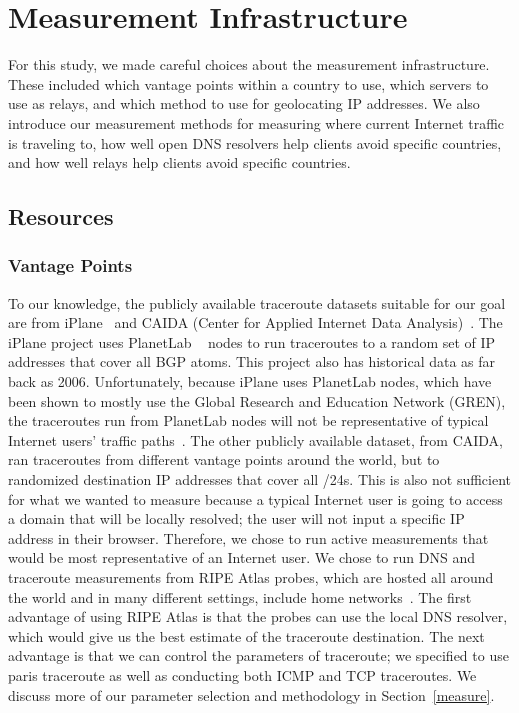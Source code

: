 \section{Measurement Infrastructure}
\label{datasets}
For this study, we made careful choices about the measurement infrastructure.  These included which vantage points within a country to use, which servers to use as relays, and which method to use for geolocating IP addresses.  We also introduce our measurement methods for measuring where current Internet traffic is traveling to, how well open DNS resolvers help clients avoid specific countries, and how well relays help clients avoid specific countries.

\subsection{Resources}
\subsubsection{Vantage Points}
To our knowledge, the publicly available traceroute datasets suitable for our goal are from iPlane~\cite{madhyastha2006iplane} and CAIDA (Center for Applied Internet Data Analysis)~\cite{caida}.  The iPlane project uses PlanetLab ~\cite{planetlab} nodes to run traceroutes to a random set of IP addresses that cover all BGP atoms.  This project also has historical data as far back as 2006.  Unfortunately, because iPlane uses PlanetLab nodes, which have been shown to mostly use the Global Research and Education Network (GREN), the traceroutes run from PlanetLab nodes will not be representative of typical Internet users' traffic paths~\cite{banerjee2004interdomain}.  The other publicly available dataset, from CAIDA, ran traceroutes from different vantage points around the world, but to randomized destination IP addresses that cover all /24s.  This is also not sufficient for what we wanted to measure because a typical Internet user is going to access a domain that will be locally resolved; the user will not input a specific IP address in their browser.  Therefore, we chose to run active measurements that would be most representative of an Internet user.  We chose to run DNS and traceroute measurements from RIPE Atlas probes, which are hosted all around the world and in many different settings, include home networks~\cite{ripe_atlas}.  The first advantage of using RIPE Atlas is that the probes can use the local DNS resolver, which would give us the best estimate of the traceroute destination.  The next advantage is that we can control the parameters of traceroute; we specified to use paris traceroute as well as conducting both ICMP and TCP traceroutes.  We discuss more of our parameter selection and methodology in Section~\ref{measure}.

